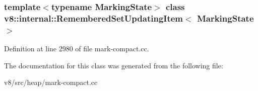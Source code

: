 \subsubsection*{template$<$typename Marking\+State$>$\newline
class v8\+::internal\+::\+Remembered\+Set\+Updating\+Item$<$ Marking\+State $>$}



Definition at line 2980 of file mark-\/compact.\+cc.



The documentation for this class was generated from the following file\+:\begin{DoxyCompactItemize}
\item 
v8/src/heap/mark-\/compact.\+cc\end{DoxyCompactItemize}
